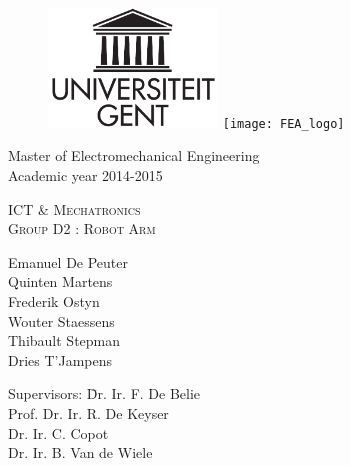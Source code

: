 \documentclass[a4paper,11pt,oneside,onecolumn]{article}
\begin{document}
\begin{titlepage}
		\begin{center}
			
			\vspace{5cm}			
			\begin{figure}[H]
				\begin{center}
					\includegraphics[width=4.5cm]{logo_ugent}
					\hspace{5cm}
					\texttt{[image: FEA\_logo]}
				\end{center}
			\end{figure}
			
			\vspace{2cm}
			\Large{Master of Electromechanical Engineering\\[2mm]Academic year 2014-2015}

			\vspace{3cm}
			\huge{\textsc{ICT \& Mechatronics\\ 
			Group D2 : Robot Arm}}

	
			
			\vspace{2cm}
			\large{Emanuel De Peuter\\ Quinten Martens\\ Frederik Ostyn\\ Wouter Staessens\\ Thibault Stepman\\ Dries T'Jampens}

			\end{center}	

			\vspace{2cm}

			\begin{large} \begin{tabbing}
			Supervisors: \= Dr. Ir. F. De Belie \\
			\> Prof. Dr. Ir. R. De Keyser \\
			\> Dr. Ir. C. Copot \\
			\> Dr. Ir. B. Van de Wiele
			\end{tabbing} \end{large}

\end{titlepage}
\end{document}

